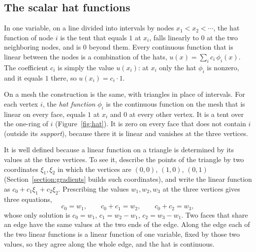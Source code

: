 \subsection{The scalar hat functions}

In one variable, on a line divided into intervals by nodes $x_1 < x_2 < \cdots$, the hat function of node $i$ is the tent that equals $1$ at $x_i$, falls linearly to $0$ at the two neighboring nodes, and is $0$ beyond them. Every continuous function that is linear between the nodes is a combination of the hats, $u(x) = \sum_i c_i\, \phi_i(x)$. The coefficient $c_i$ is simply the value $u(x_i)$: at $x_i$ only the hat $\phi_i$ is nonzero, and it equals $1$ there, so $u(x_i) = c_i \cdot 1$.

On a mesh the construction is the same, with triangles in place of intervals. For each vertex $i$, the \emph{hat function} $\phi_i$ is the continuous function on the mesh that is linear on every face, equals $1$ at $x_i$ and $0$ at every other vertex. It is a tent over the one-ring of $i$ (Figure~\ref{fig:hat}). It is zero on every face that does not contain $i$ (outside its \emph{support}), because there it is linear and vanishes at the three vertices.

It is well defined because a linear function on a triangle is determined by its values at the three vertices. To see it, describe the points of the triangle by two coordinates $\xi_1, \xi_2$ in which the vertices are $(0, 0)$, $(1, 0)$, $(0, 1)$ (Section~\ref{section:gradients} builds such coordinates), and write the linear function as $c_0 + c_1 \xi_1 + c_2\xi_2$. Prescribing the values $w_1, w_2, w_3$ at the three vertices gives three equations,
\begin{equation*}
c_0 = w_1, \qquad c_0 + c_1 = w_2, \qquad c_0 + c_2 = w_3 ,
\end{equation*}
whose only solution is $c_0 = w_1$, $c_1 = w_2 - w_1$, $c_2 = w_3 - w_1$. Two faces that share an edge have the same values at the two ends of the edge. Along the edge each of the two linear functions is a linear function of one variable, fixed by those two values, so they agree along the whole edge, and the hat is continuous.

